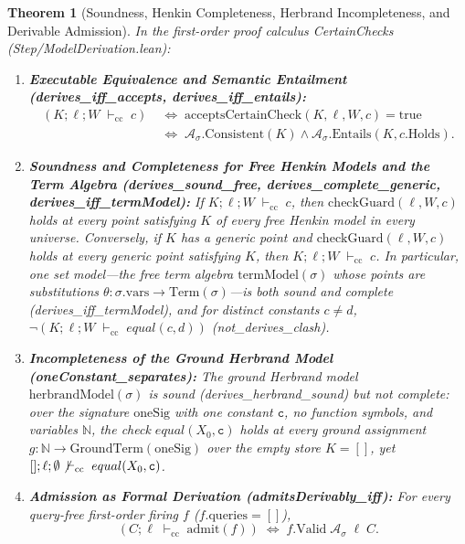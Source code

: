 \documentclass[11pt,a4paper]{article}
\newtheorem{theorem}{Theorem}[section]
\theoremstyle{definition}
\DeclareRobustCommand{\lean}[1]{%
  \ifmmode\text{\normalfont\ttfamily\footnotesize\detokenize{#1}}%
  \else{\normalfont\footnotesize\leanurl{#1}}\fi}
\DeclareRobustCommand{\metta}[1]{\text{\normalfont\ttfamily\footnotesize #1}}
\def\lean#1{#1}%
\def\metta#1{#1}%
\newcommand{\ccseq}{\;\vdash_{\mathrm{cc}}\;}
\begin{document}
\begin{theorem}[Soundness, Henkin Completeness, Herbrand Incompleteness, and Derivable Admission]
\label{thm:henkin-completeness}
In the first-order proof calculus \lean{CertainChecks} (\lean{Step/ModelDerivation.lean}):
\begin{enumerate}[leftmargin=2em, nosep]
  \item \textbf{Executable Equivalence and Semantic Entailment (\lean{derives_iff_accepts}, \lean{derives_iff_entails}):}
  \[
  \begin{aligned}
    (K; \ell; W \ccseq c) &\;\iff\; \mathrm{acceptsCertainCheck}(K, \ell, W, c) = \mathrm{true} \\
    &\;\iff\; \mathcal{A}_\sigma.\mathrm{Consistent}(K) \land \mathcal{A}_\sigma.\mathrm{Entails}(K, c.\mathrm{Holds}).
  \end{aligned}
  \]
  \item \textbf{Soundness and Completeness for Free Henkin Models and the Term Algebra (\lean{derives_sound_free}, \lean{derives_complete_generic}, \lean{derives_iff_termModel}):}
  If $K; \ell; W \ccseq c$, then $\mathrm{checkGuard}(\ell, W, c)$ holds at every point satisfying $K$ of every free Henkin model in every universe. Conversely, if $K$ has a generic point and $\mathrm{checkGuard}(\ell, W, c)$ holds at every generic point satisfying $K$, then $K; \ell; W \ccseq c$. In particular, one set model---the free term algebra $\mathrm{termModel}(\sigma)$ whose points are substitutions $\theta : \sigma.\mathrm{vars} \to \mathrm{Term}(\sigma)$---is both sound and complete (\lean{derives_iff_termModel}), and for distinct constants $c \neq d$, $\neg(K; \ell; W \ccseq \metta{equal}(c, d))$ (\lean{not_derives_clash}).
  \item \textbf{Incompleteness of the Ground Herbrand Model (\lean{oneConstant_separates}):}
  The ground Herbrand model $\mathrm{herbrandModel}(\sigma)$ is sound (\lean{derives_herbrand_sound}) but \emph{not} complete: over the signature $\mathrm{oneSig}$ with one constant $\mathtt{c}$, no function symbols, and variables $\mathbb{N}$, the check $\metta{equal}(X_0, \mathtt{c})$ holds at every ground assignment $g : \mathbb{N} \to \mathrm{GroundTerm}(\mathrm{oneSig})$ over the empty store $K = []$, yet $[] ; \ell ; \emptyset \not\ccseq \metta{equal}(X_0, \mathtt{c})$.
  \item \textbf{Admission as Formal Derivation (\lean{admitsDerivably_iff}):}
  For every query-free first-order firing $f$ ($f.\mathrm{queries} = []$),
  \[
    (C; \ell \ccseq \mathrm{admit}(f)) \;\iff\; f.\mathrm{Valid}\;\mathcal{A}_\sigma\;\ell\;C.
  \]
\end{enumerate}
\end{theorem}
\end{document}
